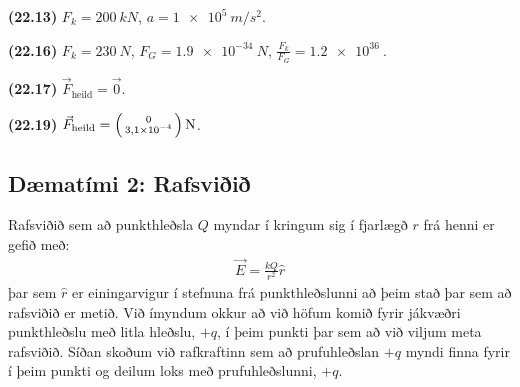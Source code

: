 \begin{tcolorbox}
\begin{enumerate*}[label = \vspace{0.15cm} ]
  \item \textbf{(22.13)} $F_k = \SI{200}{kN}$, $a = \SI{1e5}{m/s^2}$.
  \item \textbf{(22.16)} $F_k = \SI{230}{N}$, $F_G = \SI{1.9e-34}{N}$, $\frac{F_k}{F_G} = \SI{1.2e36}{}$.
  \item \textbf{(22.17)} $\Vec{F}_{\text{heild}} = \vec{0}$.
  \item \textbf{(22.19)} $\displaystyle \vec{F}_{\text{heild}} = \smqty(0 \\ \SI{3.1e-4}{}) \, \si{N}$.
\end{enumerate*}
\end{tcolorbox}

\subsection*{Dæmatími 2: Rafsviðið}

\begin{tcolorbox}
Rafsviðið sem að punkthleðsla $Q$ myndar í kringum sig í fjarlægð $r$ frá henni er gefið með:
\begin{align*}
    \vec{E} = \frac{kQ}{r^2}\hat{r}
\end{align*}
þar sem $\hat{r}$ er einingarvigur í stefnuna frá punkthleðslunni að þeim stað þar sem að rafsviðið er metið. Við ímyndum okkur að við höfum komið fyrir jákvæðri punkthleðslu með litla hleðslu, $+q$, í þeim punkti þar sem að við viljum meta rafsviðið. Síðan skoðum við rafkraftinn sem að prufuhleðslan $+q$ myndi finna fyrir í þeim punkti og deilum loks með prufuhleðslunni, $+q$.
\end{tcolorbox}

